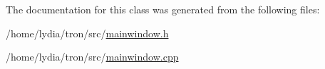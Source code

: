 The documentation for this class was generated from the following files\+:\begin{DoxyCompactItemize}
\item 
/home/lydia/tron/src/\hyperlink{mainwindow_8h}{mainwindow.\+h}\item 
/home/lydia/tron/src/\hyperlink{mainwindow_8cpp}{mainwindow.\+cpp}\end{DoxyCompactItemize}
